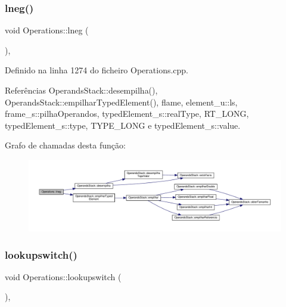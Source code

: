 \subsubsection{\texorpdfstring{lneg()}{lneg()}}
{\footnotesize\ttfamily void Operations\+::lneg (\begin{DoxyParamCaption}{ }\end{DoxyParamCaption})\hspace{0.3cm}{\ttfamily [static]}, {\ttfamily [private]}}



Definido na linha 1274 do ficheiro Operations.\+cpp.



Referências Operands\+Stack\+::desempilha(), Operands\+Stack\+::empilhar\+Typed\+Element(), flame, element\+\_\+u\+::ls, frame\+\_\+s\+::pilha\+Operandos, typed\+Element\+\_\+s\+::real\+Type, R\+T\+\_\+\+L\+O\+NG, typed\+Element\+\_\+s\+::type, T\+Y\+P\+E\+\_\+\+L\+O\+NG e typed\+Element\+\_\+s\+::value.

Grafo de chamadas desta função\+:
\nopagebreak
\begin{figure}[H]
\begin{center}
\leavevmode
\includegraphics[width=350pt]{classOperations_a0a14cc7ee880b5d5f1c3b532e8e2117c_cgraph}
\end{center}
\end{figure}
\mbox{\label{classOperations_a0458ee466daff63a3698973c89cfe71a}} 
\subsubsection{\texorpdfstring{lookupswitch()}{lookupswitch()}}
{\footnotesize\ttfamily void Operations\+::lookupswitch (\begin{DoxyParamCaption}{ }\end{DoxyParamCaption})\hspace{0.3cm}{\ttfamily [static]}, {\ttfamily [private]}}



